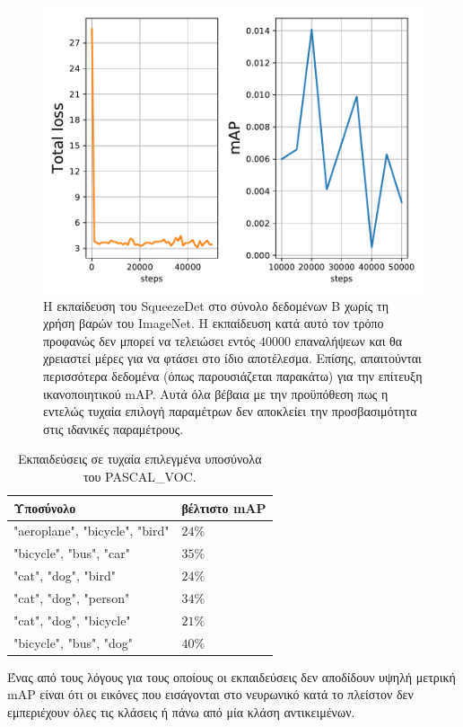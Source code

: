 \begin{figure}
\centering
\includegraphics[width = \textwidth]{figures/experiments/Btrain2.pdf}
\caption[Η εκπαίδευση του SqueezeDet στο σύνολο δεδομένων B, χωρίς τη χρήση βαρών του ImageNet]{Η εκπαίδευση του SqueezeDet στο σύνολο δεδομένων B χωρίς τη χρήση βαρών του ImageNet. Η εκπαίδευση κατά αυτό τον τρόπο προφανώς δεν μπορεί να τελειώσει εντός $40000$ επαναλήψεων και θα χρειαστεί μέρες για να φτάσει στο ίδιο αποτέλεσμα. Επίσης, απαιτούνται περισσότερα δεδομένα (όπως παρουσιάζεται παρακάτω) για την επίτευξη ικανοποιητικού mAP. Αυτά όλα βέβαια με την προϋπόθεση πως η εντελώς τυχαία επιλογή παραμέτρων δεν αποκλείει την προσβασιμότητα στις ιδανικές παραμέτρους.}
\label{fig:Btrain2}
\end{figure}

\begin{table}[]
\centering
\caption{Εκπαιδεύσεις σε τυχαία επιλεγμένα υποσύνολα του PASCAL\_VOC.}
\label{table:subsetSearch}
\begin{tabular}{|l|l|}
\hline
\textbf{Υποσύνολο} & βέλτιστο \textbf{mAP} \\ \hline
"aeroplane", "bicycle", "bird" & $24\%$ \\ \hline
"bicycle", "bus", "car" &  $35\%$\\ \hline
"cat", "dog", "bird" & $24\%$  \\ \hline
"cat", "dog", "person" & $34\%$ \\ \hline
"cat", "dog", "bicycle" & $21\%$ \\ \hline
"bicycle", "bus", "dog" & $40\%$ \\ \hline
\end{tabular}
\end{table}
Ένας από τους λόγους για τους οποίους οι εκπαιδεύσεις δεν αποδίδουν υψηλή μετρική mAP είναι ότι οι εικόνες που εισάγονται στο νευρωνικό κατά το πλείστον δεν εμπεριέχουν όλες τις κλάσεις ή πάνω από μία κλάση αντικειμένων.

